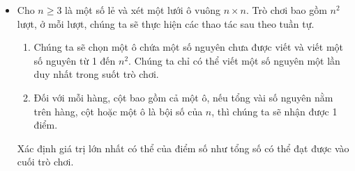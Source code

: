 \documentclass[11pt]{scrartcl}
\begin{document}
\begin{itemize}[label=, leftmargin=0em, itemsep=-0em]

    \item \begin{btvn}
        Cho $n \geq 3$ là một số lẻ và xét một lưới ô vuông $n\times n$. Trò chơi bao gồm $n^2$ lượt, ở mỗi lượt, chúng ta sẽ thực hiện các thao tác sau theo tuần tự.
        \begin{enumerate}
            \item Chúng ta sẽ chọn một ô chứa một số nguyên chưa được viết và viết một số nguyên từ 1 đến $n^2$. Chúng ta chỉ có thể viết một số nguyên một lần duy nhất trong suốt trò chơi.
            \item Đối với mỗi hàng, cột bao gồm cả một ô, nếu tổng vài số nguyên  nằm trên hàng, cột hoặc một ô là bội số của $n$, thì chúng ta sẽ nhận được 1 điểm.
        \end{enumerate}
        Xác định giá trị lớn nhất có thể của điểm số như tổng số có thể đạt được vào cuối trò chơi.
    \end{btvn}


\end{itemize}
\end{document}
